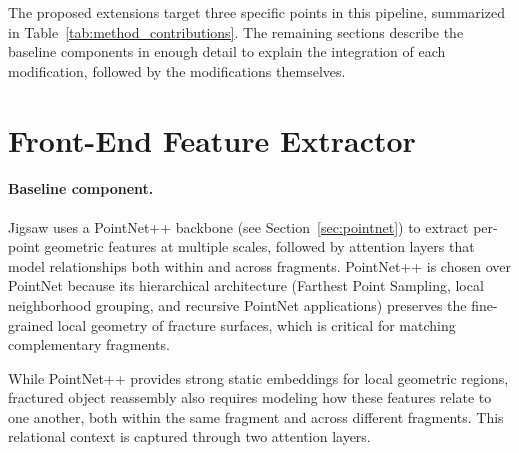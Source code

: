 The proposed extensions target three specific points in this pipeline, summarized in Table~\ref{tab:method_contributions}. The remaining sections describe the baseline components in enough detail to explain the integration of each modification, followed by the modifications themselves.

\begin{table}[H]
\centering
\caption{Overview of the proposed modifications and their integration points in the Jigsaw pipeline.}
\label{tab:method_contributions}
\end{table}

\section{Front-End Feature Extractor}
\paragraph{Baseline component.}

Jigsaw uses a PointNet++ backbone (see Section~\ref{sec:pointnet}) to extract per-point geometric features at multiple scales, followed by attention layers that model relationships both within and across fragments. PointNet++ is chosen over PointNet because its hierarchical architecture (Farthest Point Sampling, local neighborhood grouping, and recursive PointNet applications) preserves the fine-grained local geometry of fracture surfaces, which is critical for matching complementary fragments.

While PointNet++ provides strong static embeddings for local geometric regions, fractured object reassembly also requires modeling how these features relate to one another, both within the same fragment and across different fragments. This relational context is captured through two attention layers.

